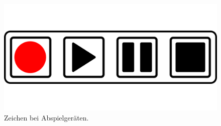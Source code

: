 \begin{figure}[htb]
\hfill
\begin{minipage}{0.3\textwidth}
\centering
\includegraphics[scale=0.1]{start_stop_play}
\caption{Zeichen bei Abspielgeräten.}
\label{figure-abspielgeraet}
\end{minipage}
\end{figure}


